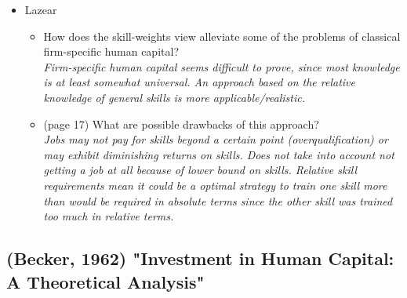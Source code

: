 \documentclass[12pt,a4paper]{article}
\begin{document}
\begin{itemize}
    \item Lazear
      \begin{itemize}
        \item How does the skill-weights view alleviate some of the problems of classical firm-specific human capital? \\
          \emph{Firm-specific human capital seems difficult to prove, since most knowledge is at least somewhat universal. An approach based on the relative knowledge of general skills is more applicable/realistic.}
        \item (page 17) What are possible drawbacks of this approach? \\
          \emph{Jobs may not pay for skills beyond a certain point (overqualification) or may exhibit diminishing returns on skills. Does not take into account not getting a job at all because of lower bound on skills. Relative skill requirements mean it could be a optimal strategy to train one skill more than would be required in absolute terms since the other skill was trained too much in relative terms.}

      \end{itemize}


  \end{itemize}
  \subsection{(Becker, 1962) "Investment in Human Capital: A Theoretical Analysis"} %
  \label{prt:Becker}

\end{document}
